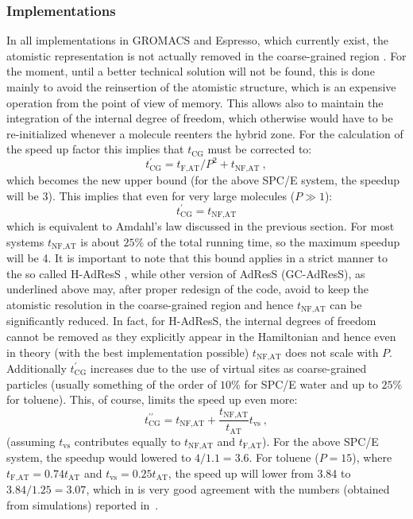 \documentclass[a4paper,preprint,unsortedaddress]{revtex4-1}
\begin{document}
\subsubsection{Implementations}
In all implementations in GROMACS and Espresso, which currently exist, the atomistic representation is not actually removed in the coarse-grained region \cite{chris}.
For the moment, until a better technical solution will not be found, this is done mainly to avoid the reinsertion of the atomistic structure, which is an expensive operation from the point of view of memory. This allows also to maintain the  integration of the internal degree of freedom, which otherwise would have to be re-initialized whenever a molecule reenters the hybrid zone.
For the calculation of the speed up factor this implies that {$t_\text{CG}$ must be corrected to:}
\begin{equation}
  t^\prime_\text{CG} = t_\text{F,AT}/P^2 + t_\text{NF,AT}~,
  \label{equ:t_force_scale}
\end{equation}
which becomes the new upper bound (for the above SPC/E system, the speedup will be 3). This implies that even for very large molecules ($P \gg 1$):
\begin{equation}
  t^\prime_\text{CG} = t_\text{NF,AT}
\end{equation}
which is equivalent to Amdahl's law discussed in the previous section. For most systems $t_\text{NF,AT}$ is about $25\%$ of the total running time, so the maximum speedup will be 4.
It is important to note that this bound applies in a strict manner to the so called H-AdResS \cite{kurt}, while other version of AdResS (GC-AdResS), as underlined above may, after proper redesign of the code, avoid to keep the atomistic resolution in the coarse-grained region and hence $t_\text{NF,AT}$ can be significantly reduced. In fact, for H-AdResS, the internal degrees of freedom cannot be removed as they explicitly appear in the Hamiltonian and hence even in theory (with the best implementation possible) $t_\text{NF,AT}$ does not scale with $P$. 
Additionally $t^\prime_\text{CG}$ increases due to the use of virtual sites as coarse-grained particles (usually something of the order of $10\%$ for SPC/E water and up to $25\%$ for toluene). 
This, of course, limits the speed up even more:
\begin{equation}
  t^{\prime\prime}_\text{CG} = t_\text{NF,AT}+\frac{t_\text{NF,AT}}{t_\text{AT}}t_\text{vs}~,
  \label{equ:t_vs_correction}
\end{equation}
(assuming $t_\text{vs}$ contributes equally to $t_\text{NF,AT}$ and $t_\text{F,AT}$). For the above SPC/E system, the speedup would lowered to $4/1.1 = 3.6$.
For toluene ($P=15$), where $t_\text{F,AT}=0.74 t_\text{AT}$ and $t_\text{vs}=0.25t_\text{AT}$, the speed up will lower from 3.84 to $3.84/1.25=3.07$, 
which in is very good agreement with the numbers (obtained from simulations) reported in~\cite{toluene}.
\end{document}
